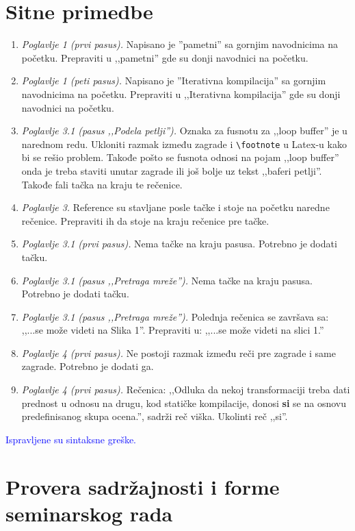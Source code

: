 \documentclass[a4paper]{report}
\newcommand{\odgovor}[1]{\textcolor{blue}{#1}}
\begin{document}
\section{Sitne primedbe}
\begin{enumerate}
	\item \textit{Poglavlje 1 (prvi pasus).} Napisano je ''pametni'' sa gornjim navodnicima na početku. Prepraviti u ,,pametni'' gde su donji navodnici na početku.
	\item \textit{Poglavlje 1 (peti pasus).} Napisano je ''Iterativna kompilacija'' sa gornjim navodnicima na početku. Prepraviti u ,,Iterativna kompilacija'' gde su donji navodnici na početku.
	\item \textit{Poglavlje 3.1 (pasus ,,Podela petlji'').} Oznaka za fusnotu za ,,loop buffer'' je u narednom redu. Ukloniti razmak između zagrade i \verb!\footnote! u Latex-u kako bi se rešio problem. Takođe pošto se fusnota odnosi na pojam ,,loop buffer'' onda je treba staviti unutar zagrade ili još bolje uz tekst ,,baferi petlji''. Takođe fali tačka na kraju te rečenice.
	\item \textit{Poglavlje 3.} Reference su stavljane posle tačke i stoje na početku naredne rečenice. Prepraviti ih da stoje na kraju rečenice pre tačke.
	\item \textit{Poglavlje 3.1 (prvi pasus).} Nema tačke na kraju pasusa. Potrebno je dodati tačku.
	\item \textit{Poglavlje 3.1 (pasus ,,Pretraga mreže'').} Nema tačke na kraju pasusa. Potrebno je dodati tačku.
	\item \textit{Poglavlje 3.1 (pasus ,,Pretraga mreže'').} Polednja rečenica se završava sa: ,,...se može videti na Slika 1''. Prepraviti u: ,,...se može videti na slici 1.''
	\item \textit{Poglavlje 4 (prvi pasus).} Ne postoji razmak između reči pre zagrade i same zagrade. Potrebno je dodati ga.
	\item \textit{Poglavlje 4 (prvi pasus).} Rečenica: ,,Odluka da nekoj transformaciji treba dati prednost u odnosu na drugu, kod statičke kompilacije, donosi \textbf{si} se na osnovu predefinisanog skupa ocena.'', sadrži reč viška. Ukolinti reč ,,si''.
\end{enumerate}
\odgovor { Ispravljene su sintaksne greške. }
\section{Provera sadržajnosti i forme seminarskog rada}
\end{document}
